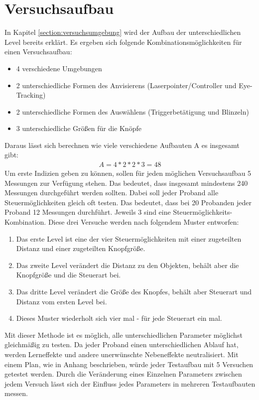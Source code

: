 \section{Versuchsaufbau} 
In Kapitel \ref{section:versuchsumgebung} wird der Aufbau der unterschiedlichen Level bereits erklärt. Es ergeben sich folgende Kombinationsmöglichkeiten für einen Versuchsaufbau:
\begin{itemize}
	\item 4 verschiedene Umgebungen
	\item 2 unterschiedliche Formen des Anvisierens (Laserpointer/Controller und Eye-Tracking)
	\item 2 unterschiedliche Formen des Auswählens (Triggerbetätigung und Blinzeln)
	\item 3 unterschiedliche Größen für die Knöpfe
\end{itemize}
Daraus lässt sich berechnen wie viele verschiedene Aufbauten A es insgesamt gibt:
\begin{align}
	A=4*2*2*3=48
\end{align}
Um erste Indizien geben zu können, sollen für jeden möglichen Versuchsaufbau 5 Messungen zur Verfügung stehen. Das bedeutet, dass insgesamt mindestens 240 Messungen durchgeführt werden sollten. Dabei soll jeder Proband alle Steuermöglichkeiten gleich oft testen. Das bedeutet, dass bei 20 Probanden jeder Proband 12 Messungen durchführt. Jeweils 3 sind eine Steuermöglichkeits-Kombination. Diese drei Versuche werden nach folgendem Muster entworfen:
\begin{enumerate}
	\item Das erste Level ist eine der vier Steuermöglichkeiten mit einer zugeteilten Distanz und einer zugeteilten Knopfgröße.
	\item Das zweite Level verändert die Distanz zu den Objekten, behält aber die Knopfgröße und die Steuerart bei.
	\item Das dritte Level verändert die Größe des Knopfes, behält aber Steuerart und Distanz vom ersten Level bei.
	\item Dieses Muster wiederholt sich vier mal - für jede Steuerart ein mal.
\end{enumerate}
Mit dieser Methode ist es möglich, alle unterschiedlichen Parameter möglichst gleichmäßig zu testen. Da jeder Proband einen unterschiedlichen Ablauf hat, werden Lerneffekte und andere unerwünschte Nebeneffekte neutralisiert. Mit einem Plan, wie in Anhang  beschrieben, würde jeder Testaufbau mit 5 Versuchen getestet werden. Durch die Veränderung eines Einzelnen Parameters zwischen jedem Versuch lässt sich der Einfluss jedes Parameters in mehreren Testaufbauten messen. 

